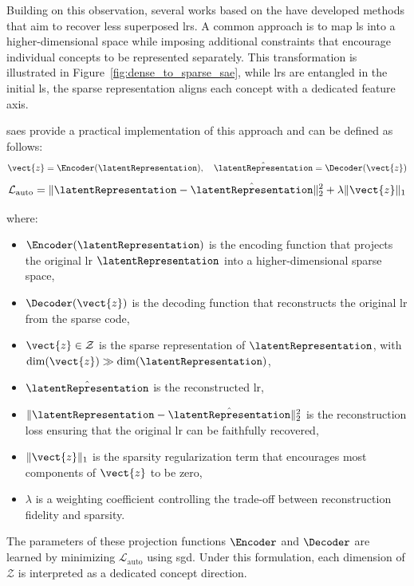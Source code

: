 Building on this observation, several works based on the \SuperpositionHypothesisName have developed methods that aim to recover less superposed \glspl{lr}.
A common approach is to map \gls{ls} into a higher-dimensional space while imposing additional constraints that encourage individual concepts to be represented separately.
This transformation is illustrated in Figure~\ref{fig:dense_to_sparse_sae}, while \glspl{lr} are entangled in the initial \gls{ls}, the sparse representation aligns each concept with a dedicated feature axis.



\glspl{sae} provide a practical implementation of this approach and can be defined as follows:
\[
\vect{z} = \Encoder(\latentRepresentation), \quad \hat{\latentRepresentation} = \Decoder(\vect{z})
\]
\[
\mathcal{L}_{\mathrm{auto}} = \|\latentRepresentation - \hat{\latentRepresentation}\|_2^2 + \lambda \|\vect{z}\|_1
\]

where:
\begin{itemize}
    \item $\Encoder(\latentRepresentation)$ is the encoding function that projects the original \gls{lr} $\latentRepresentation$ into a higher-dimensional sparse space,
    \item $\Decoder(\vect{z})$ is the decoding function that reconstructs the original \gls{lr} from the sparse code,
    \item $\vect{z} \in \mathcal{Z}$ is the sparse representation of $\latentRepresentation$, with $\dim(\vect{z}) \gg \dim(\latentRepresentation)$,
    \item $\hat{\latentRepresentation}$ is the reconstructed \gls{lr},
    \item $\|\latentRepresentation - \hat{\latentRepresentation}\|_2^2$ is the reconstruction loss ensuring that the original \gls{lr} can be faithfully recovered,
    \item $\|\vect{z}\|_1$ is the sparsity regularization term that encourages most components of $\vect{z}$ to be zero,
    \item $\lambda$ is a weighting coefficient controlling the trade-off between reconstruction fidelity and sparsity.
\end{itemize}

The parameters of these projection functions $\Encoder$ and $\Decoder$ are learned by minimizing $\mathcal{L}_{\mathrm{auto}}$ using \gls{sgd}.
Under this formulation, each dimension of $\mathcal{Z}$ is interpreted as a dedicated concept direction.

